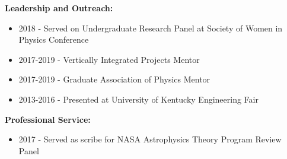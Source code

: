 \documentclass[11pt]{article}
\begin{document}
\begin{flushleft}
  \textbf{Leadership and Outreach:}
  \begin{itemize}
  \item 2018 - Served on Undergraduate Research Panel at Society of Women in Physics Conference
  \item 2017-2019 - Vertically Integrated Projects Mentor
  \item 2017-2019 - Graduate Association of Physics Mentor
  \item 2013-2016 - Presented at University of Kentucky Engineering Fair
  \end{itemize}

  \textbf{Professional Service: }
  \begin{itemize}
  \item 2017 - Served as scribe for NASA Astrophysics Theory Program Review Panel
  \end{itemize}
  
\end{flushleft}
\end{document}
